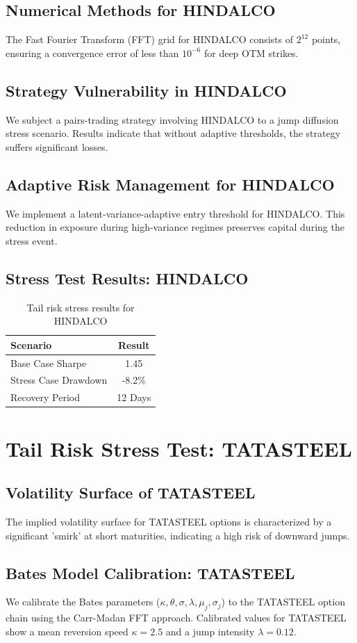 \documentclass[12pt,a4paper,twoside]{article}
\begin{document}
\subsection{Numerical Methods for HINDALCO}
The Fast Fourier Transform (FFT) grid for HINDALCO consists of $2^{12}$ points, ensuring a convergence error of less than $10^{-6}$ for deep OTM strikes.
\subsection{Strategy Vulnerability in HINDALCO}
We subject a pairs-trading strategy involving HINDALCO to a jump diffusion stress scenario. Results indicate that without adaptive thresholds, the strategy suffers significant losses.
\subsection{Adaptive Risk Management for HINDALCO}
We implement a latent-variance-adaptive entry threshold for HINDALCO. This reduction in exposure during high-variance regimes preserves capital during the stress event.
\subsection{Stress Test Results: HINDALCO}
\begin{table}[H]
\centering
\begin{tabular}{|l|c|}
\hline
Scenario & Result \\
\hline
Base Case Sharpe & 1.45 \\
Stress Case Drawdown & -8.2\% \\
Recovery Period & 12 Days \\
\hline
\end{tabular}
\caption{Tail risk stress results for HINDALCO}
\end{table}
\newpage

\section{Tail Risk Stress Test: TATASTEEL}
\subsection{Volatility Surface of TATASTEEL}
The implied volatility surface for TATASTEEL options is characterized by a significant 'smirk' at short maturities, indicating a high risk of downward jumps.
\subsection{Bates Model Calibration: TATASTEEL}
We calibrate the Bates parameters ($\kappa, \theta, \sigma, \lambda, \mu_j, \sigma_j$) to the TATASTEEL option chain using the Carr-Madan FFT approach.
Calibrated values for TATASTEEL show a mean reversion speed $\kappa = 2.5$ and a jump intensity $\lambda = 0.12$.
\end{document}
